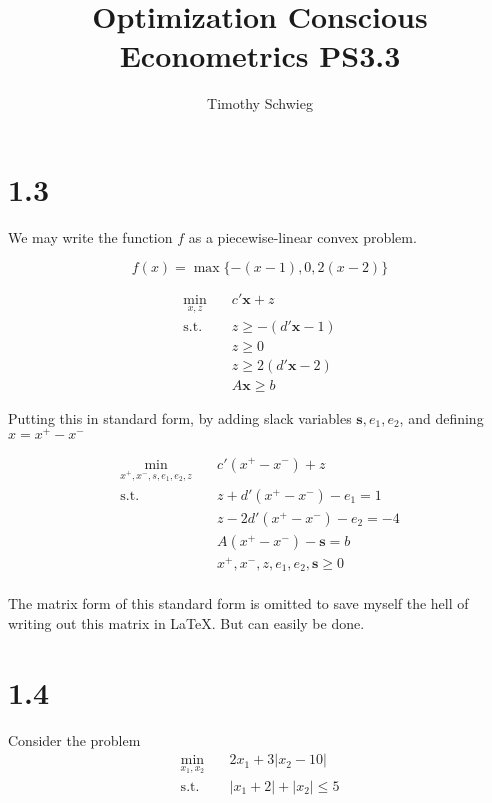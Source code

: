 \documentclass[12pt]{paper}
\title{Optimization Conscious Econometrics PS3.3}
\author{Timothy Schwieg}
\newcommand{\abs}[1]{\left \lvert #1 \right \rvert}
\begin{document}
\maketitle

\section{1.3}

We may write the function $f$ as a piecewise-linear convex problem.

\begin{equation*}
  f(x) = \max\{ -(x-1), 0, 2(x-2) \}
\end{equation*}

\begin{align*}
  \min_{x,z} \quad & c' \bm{x} + z\\
  \text{s.t. } &z \geq -(d' \bm{x} -1)\\
                & z \geq 0\\
                & z \geq 2(d' \bm{x} - 2)\\
  &A \bm{x} \geq b
\end{align*}

Putting this in standard form, by adding slack variables
$\bm{s},e_1,e_2$, and defining $x = x^+ - x^-$

\begin{align*}
  \min_{x^+, x^-, s, e_1, e_2, z} \quad & c'(x^+ - x^-) + z\\
  \text{s.t. } &z + d'(x^+ - x^-) - e_1 = 1\\
                &z - 2d'(x^+ - x^-) - e_2 = -4\\
                &A(x^+ - x^-) - \bm{s} = b\\
                &x^+,x^-, z, e_1, e_2, \bm{s} \geq 0\\
\end{align*}

The matrix form of this standard form is omitted to save myself the
hell of writing out this matrix in \LaTeX. But can easily be done.

\section{1.4}

Consider the problem
\begin{align*}
  \min_{x_1, x_2} \quad &2x_1 + 3\abs{x_2 - 10}\\
  \text{s.t. } &\abs{x_1 +2} + \abs{x_2} \leq 5
\end{align*}
\end{document}
